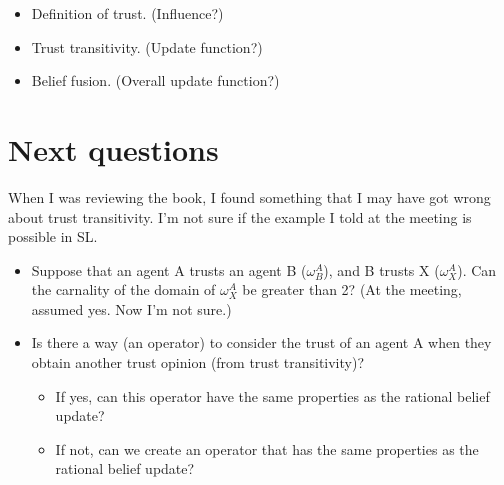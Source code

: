 \documentclass[a4paper,12pt]{article}
\theoremstyle{definition}
\numberwithin{equation}{section}
\begin{document}
\begin{itemize}
	\item Definition of trust. (Influence?)
	
	\item Trust transitivity. (Update function?)
	
	\item Belief fusion. (Overall update function?)
\end{itemize}

\section{Next questions}

When I was reviewing the book, I found something that I may have got wrong about trust transitivity. I'm not sure if the example I told at the meeting is possible in SL.

\begin{itemize}
	\item Suppose that an agent A trusts an agent B ($\omega^A_B$), and B trusts X ($\omega^A_X$). Can the carnality of the domain of $\omega^A_X$ be greater than 2? (At the meeting, assumed yes. Now I'm not sure.)
	
	\item Is there a way (an operator) to consider the trust of an agent A when they obtain another trust opinion (from trust transitivity)?
	
	\begin{itemize}
		\item If yes, can this operator have the same properties as the rational belief update?
		
		\item If not, can we create an operator that has the same properties as the rational belief update?
	\end{itemize}
\end{itemize}


%
%
\end{document}

